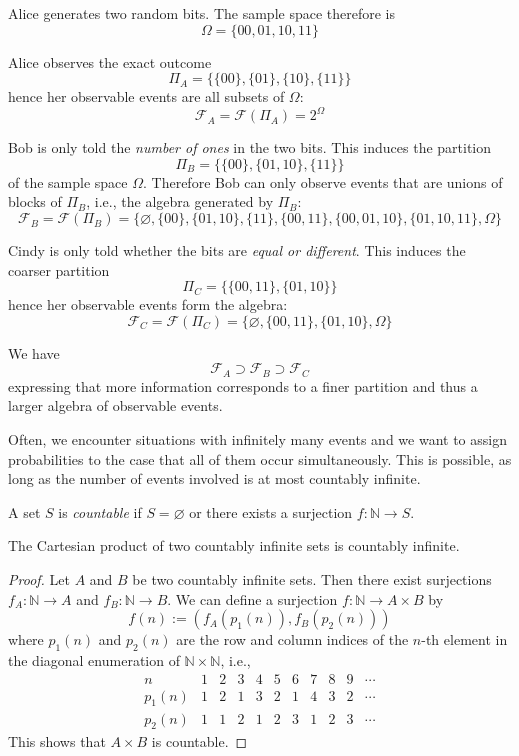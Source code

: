 \begin{example}\label{ex-info-algebras} %
Alice generates two random bits. 
The sample space therefore is
\[
\Omega = \{00,01,10,11\}
\]

Alice observes the exact outcome
\[
\Pi_A = \bigl\{\{00\},\{01\},\{10\},\{11\}\bigr\}
\]
hence her observable events are all subsets of $\Omega$:
\[
\mathcal{F}_A 
=
\mathcal{F}(\Pi_A)
= 
2^\Omega
\]

Bob is only told the \emph{number of ones} in the two bits. 
This induces the partition
\[
\Pi_B = \bigl\{\{00\},\{01,10\},\{11\}\bigr\}
\]
of the sample space $\Omega$.
Therefore Bob can only observe events that are unions of blocks of $\Pi_B$, i.e., the algebra generated by $\Pi_B$:
\[
\mathcal{F}_B
=
\mathcal{F}(\Pi_B)
=
\{
\varnothing,\{00\},\{01,10\},\{11\},\{00,11\},\{00,01,10\},\{01,10,11\},\Omega
\}
\]

Cindy is only told whether the bits are \emph{equal or different}. 
This induces the coarser partition
\[
\Pi_C 
=
\bigl\{\{00,11\},\{01,10\}\bigr\}
\]
hence her observable events form the algebra:
\[
\mathcal{F}_C
=
\mathcal{F}(\Pi_C) 
= 
\{\varnothing,\{00,11\},\{01,10\},\Omega\}
\]

We have
\[
\mathcal{F}_A \supset \mathcal{F}_B \supset \mathcal{F}_C
\]
expressing that more information corresponds to a finer partition and thus a larger algebra of observable events.
\end{example}

Often, we encounter situations with infinitely many events and we want to assign probabilities to the case that all of them occur simultaneously.
This is possible, as long as the number of events involved is at most countably infinite.



\begin{definition}\label{def:countable-set}
A set $S$ is \emph{countable} if $S = \varnothing$ or there exists a surjection $f : \mathbb{N} \to S$.
\end{definition}

\begin{theorem}\label{thm:cartesian-product-countable}
The Cartesian product of two countably infinite sets is countably infinite.
\end{theorem}
\begin{proof}
Let $A$ and $B$ be two countably infinite sets.
Then there exist surjections $f_A : \mathbb{N} \to A$ and $f_B : \mathbb{N} \to B$.
We can define a surjection $f : \mathbb{N} \to A \times B$ by
\[
f(n) := (f_A(p_1(n)), f_B(p_2(n)))
\]
where $p_1(n)$ and $p_2(n)$ are the row and column indices of the $n$-th element in the diagonal enumeration of $\mathbb{N} \times \mathbb{N}$, i.e.,
\[
\begin{array}{c|cccccccccc}
n      & 1 & 2 & 3 & 4 & 5 & 6 & 7 & 8 & 9 & \cdots\\
\hline
p_1(n) & 1 & 2 & 1 & 3 & 2 & 1 & 4 & 3 & 2 & \cdots\\
p_2(n) & 1 & 1 & 2 & 1 & 2 & 3 & 1 & 2 & 3 & \cdots
\end{array}
\]
This shows that $A \times B$ is countable.
\end{proof}


